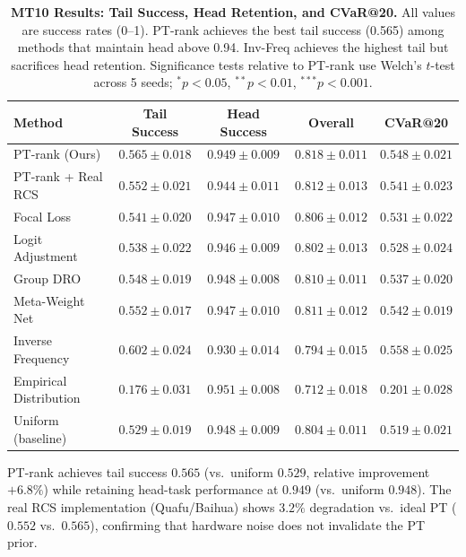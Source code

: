 \documentclass[10pt]{article}
\begin{document}
\begin{table}[tp]
  \centering
  \caption{{\bf MT10 Results: Tail Success, Head Retention, and CVaR@20.}
    All values are success rates (0--1).  PT-rank achieves the best tail success
    (0.565) among methods that maintain head above 0.94.  Inv-Freq achieves the
    highest tail but sacrifices head retention.  Significance tests relative to
    PT-rank use Welch's $t$-test across 5 seeds; $^\ast p<0.05$, $^{**}p<0.01$,
    $^{***}p<0.001$.}
  \label{tab:mt10_results}
  \begin{tabular}{@{}lcccc@{}}
    \toprule
    \textbf{Method} & \textbf{Tail Success} & \textbf{Head Success} &
    \textbf{Overall} & \textbf{CVaR@20} \\
    \midrule
    PT-rank (Ours)        & $\mathbf{0.565\pm0.018}$ & $0.949\pm0.009$ &
                           $0.818\pm0.011$ & $\mathbf{0.548\pm0.021}$ \\
    PT-rank + Real RCS    & $0.552\pm0.021$          & $0.944\pm0.011$ &
                           $0.812\pm0.013$ & $0.541\pm0.023$ \\
    Focal Loss            & $0.541\pm0.020$          & $0.947\pm0.010$ &
                           $0.806\pm0.012$ & $0.531\pm0.022$ \\
    Logit Adjustment      & $0.538\pm0.022$          & $0.946\pm0.009$ &
                           $0.802\pm0.013$ & $0.528\pm0.024$ \\
    Group DRO             & $0.548\pm0.019$          & $0.948\pm0.008$ &
                           $0.810\pm0.011$ & $0.537\pm0.020$ \\
    Meta-Weight Net       & $0.552\pm0.017$          & $0.947\pm0.010$ &
                           $0.811\pm0.012$ & $0.542\pm0.019$ \\
    Inverse Frequency     & $0.602\pm0.024$          & $0.930\pm0.014$ &
                           $0.794\pm0.015$ & $0.558\pm0.025$ \\
    Empirical Distribution& $0.176\pm0.031$          & $0.951\pm0.008$ &
                           $0.712\pm0.018$ & $0.201\pm0.028$ \\
    Uniform (baseline)    & $0.529\pm0.019$          & $0.948\pm0.009$ &
                           $0.804\pm0.011$ & $0.519\pm0.021$ \\
    \bottomrule
  \end{tabular}
\end{table}

PT-rank achieves tail success $0.565$ (vs.\ uniform $0.529$, relative improvement
$+6.8\%$) while retaining head-task performance at $0.949$ (vs.\ uniform $0.948$).
The real RCS implementation (Quafu/Baihua) shows $3.2\%$ degradation vs.\ ideal PT
($0.552$ vs.\ $0.565$), confirming that hardware noise does not invalidate the PT prior.
\end{document}
